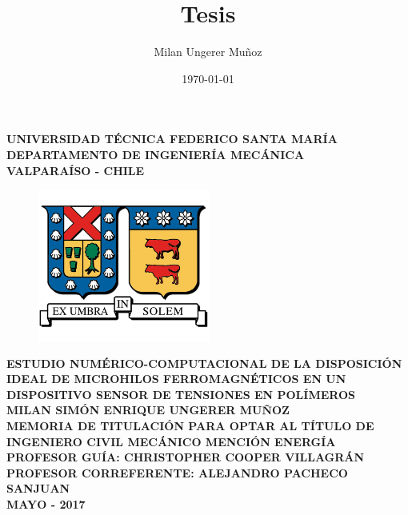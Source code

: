 \documentclass[12pt,letterpaper]{article}
\title{Tesis}
\author{Milan Ungerer Muñoz}
\date{\today}
\numberwithin{equation}{section}
\begin{document}
\begin{titlepage}
	
	\begin{center}
		\vspace*{-1in}
		
		\Large \textbf{UNIVERSIDAD TÉCNICA FEDERICO SANTA MARÍA}\\
		\vspace*{0.15in}
		\large \textbf{DEPARTAMENTO DE INGENIERÍA MECÁNICA} \\
		\vspace*{0.15in}
		\textbf{VALPARAÍSO - CHILE}
		
		\begin{figure}[h!]
			\centering\includegraphics[height=50mm]{Imagenes/Logo_UTFSM.png}
		\end{figure}
		\vspace*{0.15in}
		\Large \textbf{ESTUDIO NUMÉRICO-COMPUTACIONAL DE LA DISPOSICIÓN IDEAL DE MICROHILOS FERROMAGNÉTICOS EN UN DISPOSITIVO SENSOR DE TENSIONES EN POLÍMEROS}\\
		\vspace*{1in}
		\large\centering \textbf{MILAN SIMÓN ENRIQUE UNGERER MUÑOZ}\\
		\vspace*{0.15in}
		\centering\normalsize \textbf{MEMORIA DE TITULACIÓN PARA OPTAR AL TÍTULO DE INGENIERO CIVIL MECÁNICO MENCIÓN ENERGÍA}\\
		\vspace*{0.6in}
		\centering\normalsize \textbf{PROFESOR GUÍA: \hspace{2.5cm} CHRISTOPHER COOPER VILLAGRÁN}\\
		\vspace*{0.15in}
		\centering\normalsize \textbf{PROFESOR CORREFERENTE: \hspace{1cm} ALEJANDRO PACHECO SANJUAN}\\
		\vspace*{1in}
		\centering\normalsize \textbf{MAYO - 2017}\\
	\end{center}
	
\end{titlepage}
\newpage\null\thispagestyle{empty}\newpage
\end{document}
